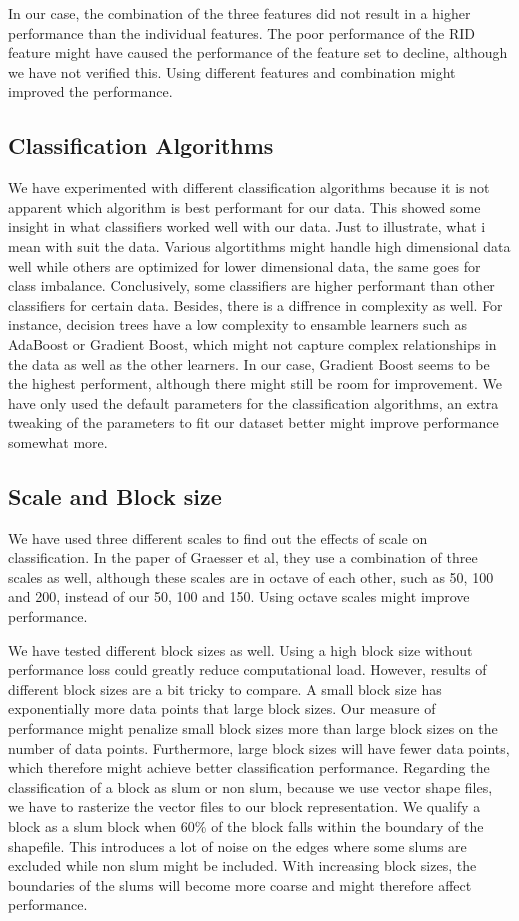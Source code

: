 In our case, the combination of the three features did not result in a higher performance than the individual features. The poor performance of the RID feature might have caused the performance of the feature set to decline, although we have not verified this. Using different features and combination might improved the performance.


\subsection{Classification Algorithms}
We have experimented with different classification algorithms because it is not apparent which algorithm is best performant for our data. This showed some insight in what classifiers worked well with our data. Just to illustrate, what i mean with suit the data. Various algortithms might handle high dimensional data well while others are optimized for lower dimensional data, the same goes for class imbalance. Conclusively, some classifiers are higher performant than other classifiers for certain data. Besides, there is a diffrence in complexity as well. For instance, decision trees have a low complexity to ensamble learners such as AdaBoost or Gradient Boost, which might not capture complex relationships in the data as well as the other learners. In our case, Gradient Boost seems to be the highest performent, although there might still be room for improvement. We have only used the default parameters for the classification algorithms, an extra tweaking of the parameters to fit our dataset better might improve performance somewhat more.


\subsection{Scale and Block size}
We have used three different scales to find out the effects of scale on classification. In the paper of Graesser et al, they use a combination of three scales as well, although these scales are in octave of each other, such as 50, 100 and 200, instead of our 50, 100 and 150. Using octave scales might improve performance.

We have tested different block sizes as well. Using a high block size without performance loss could greatly reduce computational load. However, results of different block sizes are a bit tricky to compare. A small block size has exponentially more data points that large block sizes. Our measure of performance might penalize small block sizes more than large block sizes on the number of data points. Furthermore, large block sizes will have fewer data points, which therefore might achieve better classification performance. Regarding the classification of a block as slum or non slum, because we use vector shape files, we have to rasterize the vector files to our block representation. We qualify a block as a slum block when 60\% of the block falls within the boundary of the shapefile. This introduces a lot of noise on the edges where some slums are excluded while non slum might be included. With increasing block sizes, the boundaries of the slums will become more coarse and might therefore affect performance.

